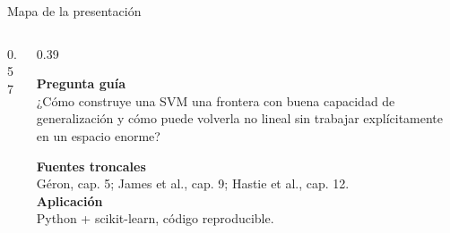 \documentclass[aspectratio=169,11pt,table]{beamer}
\begin{document}
\begin{frame}{Mapa de la presentación}
\begin{columns}[T,onlytextwidth]
\begin{column}{0.57\textwidth}
\tableofcontents
\end{column}
\begin{column}{0.39\textwidth}
\begin{keybox}
\textbf{Pregunta guía}\\[0.14cm]
¿Cómo construye una SVM una frontera con buena capacidad de generalización y cómo puede volverla no lineal sin trabajar explícitamente en un espacio enorme?
\end{keybox}
\vspace{0.16cm}
\begin{ccdebox}
\small
\textbf{Fuentes troncales}\\
Géron, cap. 5; James et al., cap. 9; Hastie et al., cap. 12.\\[0.12cm]
\textbf{Aplicación}\\
Python + scikit-learn, código reproducible.
\end{ccdebox}
\end{column}
\end{columns}
\end{frame}








\end{document}
